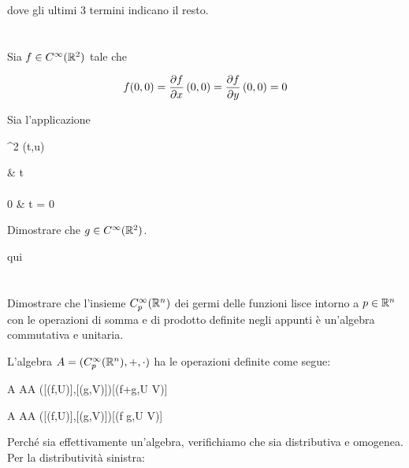 dove gli ultimi 3 termini indicano il resto.

%

\newpage

%

\section{}\label{es1-6}

\begin{tcolorbox}
	Sia $ f \in C^{\infty} (\mathbb{R}^{2}) $ tale che
	
	\begin{equation}
		f(0,0) = \pdv{f}{x} \, (0,0) = \pdv{f}{y} \, (0,0) = 0
	\end{equation}
	
	Sia l'applicazione
	
		{\R^{2}}{\R}
		{(t,u)}{%
				\begin{cases}
					 & t \neq 0\\\\
					0 & t = 0
				\end{cases}
				}
	
	Dimostrare che $ g \in C^{\infty}(\mathbb{R}^{2}) $.
\end{tcolorbox}

qui

%

\newpage

%

\section{}\label{es1-7}

\begin{tcolorbox}
	Dimostrare che l'insieme $ C_{p}^{\infty}(\mathbb{R}^{n}) $ dei germi delle funzioni lisce intorno a $ p \in \mathbb{R}^{n} $ con le operazioni di somma e di prodotto definite negli appunti è un'algebra commutativa e unitaria.
\end{tcolorbox}

L'algebra $ A = (C_{p}^{\infty}(\mathbb{R}^{n}),+,\cdot) $ ha le operazioni definite come segue:

\map{+}
	{A \times A}{A}
	{([(f,U)],[(g,V)])}{[(f+g,U \cap V)]}

\map{\cdot}
	{A \times A}{A}
	{([(f,U)],[(g,V)])}{[(f g,U \cap V)]}

Perché sia effettivamente un'algebra, verifichiamo che sia distributiva e omogenea.\\
Per la distributività sinistra:

